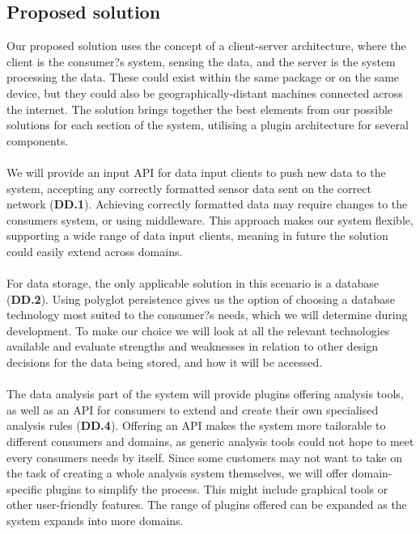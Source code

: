 \documentclass[10pt,a4paper]{article}
\begin{document}
\subsection{Proposed solution}
Our proposed solution uses the concept of a client-server architecture, where
the client is the consumer?s system, sensing the data, and the server is the
system processing the data. These could exist within the same package or on the
same device, but they could also be geographically-distant machines connected
across the internet. The solution brings together the best elements from our
possible solutions for each section of the system, utilising a plugin
architecture for several components.
\\ \\
We will provide an input API for data input clients to push new data to the
system, accepting any correctly formatted sensor data sent on the correct
network (\textbf{DD.1}). Achieving correctly formatted data may require changes
to the consumers system, or using middleware. This approach makes our system
flexible, supporting a wide range of data input clients, meaning in future the
solution could easily extend across domains.
\\ \\
For data storage, the only applicable solution in this scenario is a database
(\textbf{DD.2}). Using polyglot persistence gives us the option of choosing a
database technology most suited to the consumer?s needs, which we will determine
during development. To make our choice we will look at all the relevant
technologies available and evaluate strengths and weaknesses in relation to
other design decisions for the data being stored, and how it will be accessed.
\\ \\
The data analysis part of the system will provide plugins offering analysis
tools, as well as an API for consumers to extend and create their own
specialised analysis rules (\textbf{DD.4}). Offering an API makes the system
more tailorable to different consumers and domains, as generic analysis tools
could not hope to meet every consumers needs by itself. Since some customers may
not want to take on the task of creating a whole analysis system themselves, we
will offer domain-specific plugins to simplify the process. This might include
graphical tools or other user-friendly features. The range of plugins offered
can be expanded as the system expands into more domains.
\\ \\
\end{document}
